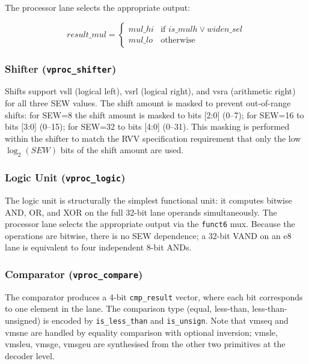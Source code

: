 The processor lane selects the appropriate output:

\begin{equation}
\mathit{result\_mul} = \begin{cases}
  \mathit{mul\_hi} & \text{if } \mathit{is\_mulh} \vee \mathit{widen\_sel} \\
  \mathit{mul\_lo} & \text{otherwise}
\end{cases}
\end{equation}

\subsubsection{Shifter (\texttt{vproc\_shifter})}

Shifts support vsll (logical left), vsrl (logical right), and vsra (arithmetic right)
for all three SEW values. The shift amount is masked to prevent out-of-range shifts:
for SEW=8 the shift amount is masked to bits [2:0] (0--7); for SEW=16 to bits [3:0]
(0--15); for SEW=32 to bits [4:0] (0--31). This masking is performed within the
shifter to match the RVV specification requirement that only the low $\log_2(\mathit{SEW})$
bits of the shift amount are used.

\subsubsection{Logic Unit (\texttt{vproc\_logic})}

The logic unit is structurally the simplest functional unit: it computes bitwise AND,
OR, and XOR on the full 32-bit lane operands simultaneously. The processor lane selects
the appropriate output via the \texttt{funct6} mux. Because the operations are bitwise,
there is no SEW dependence; a 32-bit VAND on an e8 lane is equivalent to four
independent 8-bit ANDs.

\subsubsection{Comparator (\texttt{vproc\_compare})}

The comparator produces a 4-bit \texttt{cmp\_result} vector, where each bit corresponds
to one element in the lane. The comparison type (equal, less-than, less-than-unsigned)
is encoded by \texttt{is\_less\_than} and \texttt{is\_unsign}. Note that vmseq and
vmsne are handled by equality comparison with optional inversion; vmsle, vmsleu, vmsge,
vmsgeu are synthesised from the other two primitives at the decoder level.

